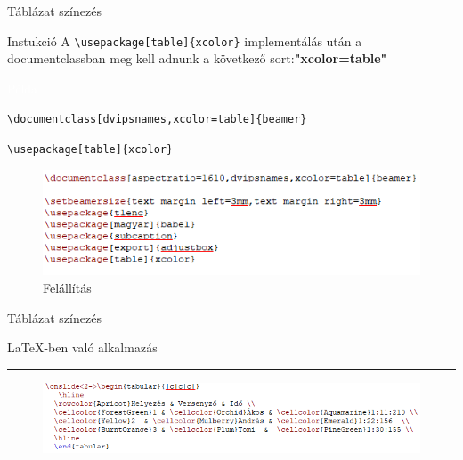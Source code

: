 \documentclass[aspectratio=1610, dvipsnames, xcolor=table]{beamer}
\begin{document}
    \begin{frame}[fragile]{Táblázat színezés}
        \begin{block}{Instukció}
            A \verb!\usepackage[table]{xcolor}! implementálás után a documentclassban meg kell adnunk a következő sort:\textbf{"xcolor=table"}
        \end{block} 
        \begin{exampleblock}{\textcolor{white}{Példa}}
        {
            \verb!\documentclass[dvipsnames,xcolor=table]{beamer}!

            \verb!\usepackage[table]{xcolor}!
        }
        \end{exampleblock}	
        \begin{figure}[H]
            \includegraphics[scale=0.8]{img/tablesetup.png}
            \caption{Felállítás}
        \end{figure}
    \end{frame}

    \begin{frame}[fragile]{Táblázat színezés}
    \begin{center}
        \LaTeX-ben való alkalmazás
        \noindent
        {\color{Dandelion} \rule{\linewidth}{1mm}}
    \end{center}
    
        \begin{figure}[H]
           \includegraphics[scale=0.8]{img/tablealkalmazas.png}        
        \end{figure}
    \end{frame}
\end{document}
